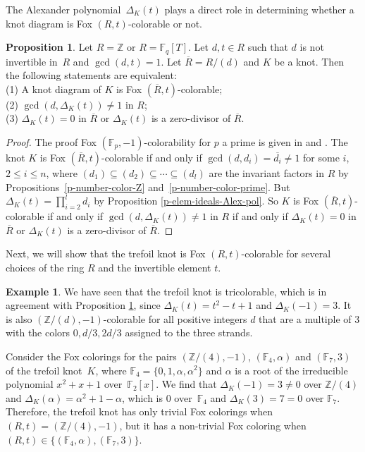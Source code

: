 \documentclass[11pt,a4paper]{article}
\theoremstyle{definition}
\newtheorem{proposition}[theorem]{Proposition}
\newtheorem{example}[theorem]{Example}
\newcommand{\numberset}{\mathbb}
\newcommand{\F}{\numberset{F}}
\newcommand{\Z}{\numberset{Z}}
\begin{document}
The Alexander polynomial~$\Delta_K(t)$ plays a direct role in determining whether a knot diagram is Fox $(R,t)$-colorable or not.

\begin{proposition}
\label{prop:determinant}
Let $R=\Z$ or $R=\F_q[T]$. 
Let $d,t \in R$ such that $d$ is not invertible in~$R$ and $\gcd(d,t)=1$.
Let $\overline{R}= R/(d)$ and $K$ be a knot.
Then the following statements are equivalent:\\
(1) A knot diagram of $K$ is Fox $(\overline{R},t)$-colorable;\\
(2) $\gcd(d,\Delta_K(t))\not=1$ in $R$;\\
(3) $\Delta_K(t)=0$ in $\overline{R}$ or  $\Delta_K(t)$ is a zero-divisor of $\overline{R}$.
\end{proposition}
\begin{proof}
The proof  Fox $(\F_p,-1)$-colorability for $p$ a prime is given in \cite[Chapter 3, Theorem 4]{livingston1993knot} and \cite[Proposition 2.1]{kauffman2018}. The knot $K$ is Fox $(\overline{R},t)$-colorable if and only if 
$\gcd (d,d_i)=\overline{d_i}\not=1$ for some $i$, $2 \leq i\leq n$, where
$(d_1)\subseteq (d_2)\subseteq \cdots \subseteq (d_l)$ are the invariant factors in $R$ 
by Propositions~\ref{p-number-color-Z} and~\ref{p-number-color-prime}.
But $\Delta_K(t)=\prod_{i=2}^l d_i$ by Proposition \ref{p-elem-ideals-Alex-pol}.
So $K$ is Fox $(\overline{R},t)$-colorable if and only if $\gcd(d,\Delta_K(t))\not=1$ in $R$ if and only if
$\Delta_K(t)=0$ in $\overline{R}$ or  $\Delta_K(t)$ is a zero-divisor of $\overline{R}$.
\end{proof}


Next, we will show that the trefoil knot is Fox $(R,t)$-colorable for several choices of the ring $R$ and the invertible element $t$.
\begin{example}
\label{ex:Z4F4}
We have seen that the trefoil knot is tricolorable, which is in agreement with Proposition \ref{prop:determinant}, since $\Delta_K(t) = t^2 - t + 1$ and $\Delta_K(-1) =3$. It is also $(\Z/(d),-1)$-colorable for all positive integers $d$ that are a multiple of $3$ with the colors $0, d/3, 2d/3$ assigned to the three strands.

Consider the Fox colorings for the pairs $(\Z/(4), -1)$, $(\mathbb{F}_4, \alpha)$ and $(\mathbb{F}_7, 3)$ of the trefoil knot~$K$, where $\mathbb{F}_4 = \{0, 1, \alpha, \alpha^2 \}$ and $\alpha$ is a root of the irreducible polynomial $x^2+x+1$ over~$\F_2[x]$. We find that $\Delta_K(-1) = 3 \neq 0$ over $\Z/(4)$ and $\Delta_K(\alpha) = \alpha^2 + 1 - \alpha$, which is 0 over~$\mathbb{F}_4$ and $\Delta_K(3) = 7 = 0$ over $\mathbb{F}_7$. Therefore, the trefoil knot has only trivial Fox colorings when~$(R,t) = (\Z/(4), -1)$, but it has a non-trivial Fox coloring when $(R,t) \in \{(\mathbb{F}_4, \alpha),(\mathbb{F}_7, 3)\}$.
\end{example}
\end{document}
